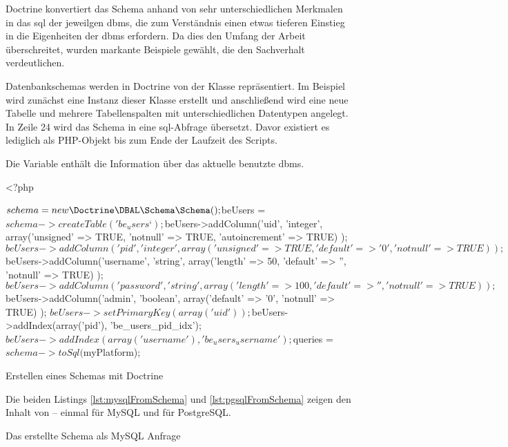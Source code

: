 Doctrine konvertiert das Schema anhand von sehr unterschiedlichen Merkmalen in das \gls{sql} der jeweilgen \gls{dbms}, die zum Verständnis einen etwas tieferen Einstieg in die Eigenheiten der \gls{dbms} erfordern. Da dies den Umfang der Arbeit überschreitet, wurden markante Beispiele gewählt, die den Sachverhalt verdeutlichen.

Datenbankschemas werden in Doctrine von der Klasse  repräsentiert. Im Beispiel wird zunächst eine Instanz dieser Klasse erstellt und anschließend wird eine neue Tabelle und mehrere Tabellenspalten mit unterschiedlichen Datentypen angelegt. In Zeile 24 wird das Schema in eine \gls{sql}-Abfrage übersetzt. Davor existiert es lediglich als PHP-Objekt bis zum Ende der Laufzeit des Scripts.

Die Variable  enthält die Information über das aktuelle benutzte \gls{dbms}.

\begin{listing}[H]
\begin{phpcode}
<?php

$schema = new \Doctrine\DBAL\Schema\Schema();
$beUsers = $schema->createTable('be_users‘);
$beUsers->addColumn('uid', 'integer',
  array('unsigned' => TRUE, 'notnull' => TRUE, 'autoincrement' => TRUE)
);
$beUsers->addColumn('pid', 'integer',
  array('unsigned' => TRUE, 'default' => '0', 'notnull' => TRUE)
);
$beUsers->addColumn('username', 'string',
  array('length' => 50, 'default' => '', 'notnull' => TRUE)
);
$beUsers->addColumn('password', 'string',
  array('length' => 100, 'default' => '', 'notnull' => TRUE)
);
$beUsers->addColumn('admin', 'boolean',
  array('default' => '0', 'notnull' => TRUE)
);
$beUsers->setPrimaryKey(array('uid'));
$beUsers->addIndex(array('pid'), 'be_users_pid_idx');
$beUsers->addIndex(array('username'), 'be_users_username');

$queries = $schema->toSql($myPlatform);
\end{phpcode}
\caption{Erstellen eines Schemas mit Doctrine}
\label{lst:createSchema}
\end{listing}

Die beiden Listings \ref{lst:mysqlFromSchema} und \ref{lst:pgsqlFromSchema} zeigen den Inhalt von  – einmal für MySQL und für PostgreSQL.

\begin{listing}[H]
\caption{Das erstellte Schema als MySQL Anfrage}
\label{lst:mysqlFromSchema}
\end{listing}

